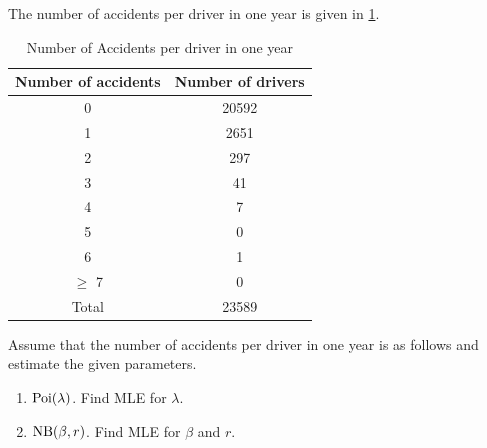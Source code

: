 \documentclass[notoc,notitlepage]{tufte-book}
\begin{document}
\begin{eg}
  The number of accidents per driver in one year is given in
  \cref{table:number_of_accidents_per_driver_in_one_year}.
  \begin{table}[ht]
    \centering
    \caption{Number of Accidents per driver in one year}
    \label{table:number_of_accidents_per_driver_in_one_year}
    \begin{tabular}{c c}
    Number of accidents & Number of drivers \\
    \hline
    0                   & 20592 \\
    1                   & 2651 \\
    2                   & 297 \\
    3                   & 41 \\
    4                   & 7 \\
    5                   & 0 \\
    6                   & 1 \\
    $\geq$ 7            & 0 \\
    \hline
    Total               & 23589
    \end{tabular}
  \end{table}
  Assume that the number of accidents per driver
  in one year is as follows and estimate the given parameters.
  \begin{enumerate}
    \item $\operatorname{Poi}(\lambda)$. Find MLE for $\lambda$.
    \item $\operatorname{NB}(\beta, r)$. Find MLE for $\beta$ and $r$.
  \end{enumerate}
\end{eg}
\end{document}
